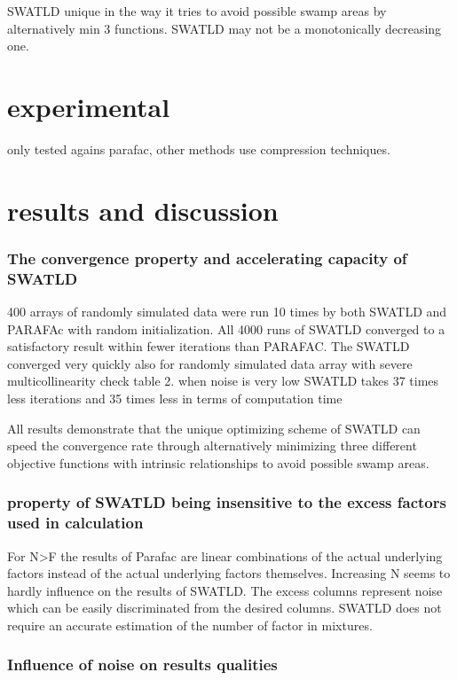 \documentclass[10pt, draft]{article}
\begin{document}
SWATLD unique in the way it tries to avoid possible swamp areas by alternatively min 3 functions.  SWATLD may not be a monotonically decreasing one.  

\section{experimental}

only tested agains parafac, other methods use compression techniques.\\

\section{results and discussion}

\subsubsection{The convergence property and accelerating capacity of SWATLD}
400 arrays of randomly simulated data were run 10 times by both SWATLD and PARAFAc with random initialization.  All 4000 runs of SWATLD converged to a satisfactory result within fewer iterations than PARAFAC. The SWATLD converged very quickly also for randomly simulated data array with severe multicollinearity check table 2.  when noise is very low SWATLD takes 37 times less iterations and 35 times less in terms of computation time\linebreak[1]

All results demonstrate that the unique optimizing scheme of SWATLD can speed the convergence rate through alternatively minimizing three different objective functions with intrinsic relationships to avoid possible swamp areas.

\subsubsection{property of SWATLD being insensitive to the excess factors used in calculation}

For N>F the results of Parafac are linear combinations of the actual underlying factors instead of the actual underlying factors themselves.  Increasing N seems to hardly influence on the results of SWATLD. The excess columns represent noise which can be easily discriminated from the desired columns.  SWATLD does not require an accurate estimation of the number of factor in mixtures.  

\subsubsection{Influence of noise on results qualities}
\end{document}
